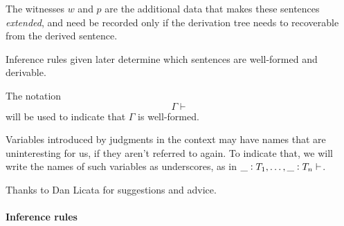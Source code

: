 \documentclass[11pt]{article}
\newcommand{\ccolon}[1]{\vcentcolon#1}
\newcommand{\ccheck}[1]{\vcentcolon#1}  %
\newcommand{\synth}[1]{\vcentcolon(\Rightarrow#1)} %
\renewcommand{\synth}[1]{\ccheck#1} %
\newcommand{\Okay}{\mathop{\text{ \sc okay}}}
\newcommand{\Context}{\vdash\Okay}
\renewcommand{\Context}{\vdash}
\newcommand{\var}{\char`_}
\begin{document}
The witnesses $w$ and $p$ are the additional data that makes these sentences
{\em extended}, and need be recorded only if the derivation tree needs to
recoverable from the derived sentence.

Inference rules given later determine which sentences are well-formed and
derivable.

The notation $$\Gamma \Context$$ will be used to indicate that $\Gamma$ is
well-formed.

Variables introduced by judgments in the context may have names that are
uninteresting for us, if they aren't referred to again.  To indicate that, we
will write the names of such variables as underscores, as in $\var
\ccolon{T_1},\dots,\var \ccolon{T_n}\Context$.


Thanks to Dan Licata for suggestions and advice.

\paragraph{Inference rules} 
\end{document}
